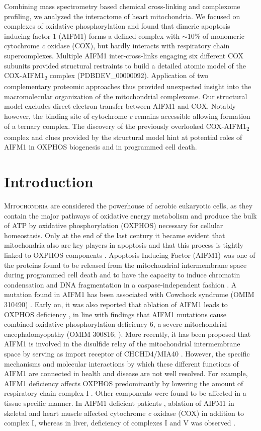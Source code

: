 \begin{abstract102}
	Combining mass spectrometry based chemical cross-linking and complexome profiling, we analyzed the interactome of heart mitochondria. We focused on complexes of oxidative phosphorylation and found that dimeric apoptosis inducing factor 1 (AIFM1) forms a defined complex with $\sim$10\% of monomeric cytochrome \emph{c} oxidase (COX), but hardly interacts with respiratory chain supercomplexes. Multiple AIFM1 inter-cross-links engaging six different COX subunits provided structural restraints to build a detailed atomic model of the COX-AIFM1\textsubscript{2} complex (PDBDEV\_00000092). Application of two complementary proteomic approaches thus provided unexpected insight into the macromolecular organization of the mitochondrial complexome. Our structural model excludes direct electron transfer between AIFM1 and COX. Notably however, the binding site of cytochrome \emph{c} remains accessible allowing formation of a ternary complex. The discovery of the previously overlooked COX-AIFM1\textsubscript{2} complex and clues provided by the structural model hint at potential roles of AIFM1 in OXPHOS biogenesis and in programmed cell death.
\end{abstract102}
\section{Introduction}
\lettrine[lraise=0.1, nindent=0em, slope=-.5em]{M}{itochondria} are considered the powerhouse of aerobic eukaryotic cells, as they contain the major pathways of oxidative energy metabolism and produce the bulk of ATP by oxidative phosphorylation (OXPHOS) necessary for cellular homeostasis. Only at the end of the last century it became evident that mitochondria also are key players in apoptosis and that this process is tightly linked to OXPHOS components \cite{RN1}. Apoptosis Inducing Factor (AIFM1) was one of the proteins found to be released from the mitochondrial intermembrane space during programmed cell death and to have the capacity to induce chromatin condensation and DNA fragmentation in a caspase-independent fashion \cite{RN2}. A mutation found in AIFM1 has been associated with Cowchock syndrome (OMIM 310490) \cite{RN3}. Early on, it was also reported that ablation of AIFM1 leads to OXPHOS deficiency \cite{RN4}, in line with findings that AIFM1 mutations cause combined oxidative phosphorylation deficiency 6, a severe mitochondrial encephalomyopathy (OMIM 300816; \cite{RN5}). More recently, it has been proposed that AIFM1 is involved in the disulfide relay of the mitochondrial intermembrane space by serving as import receptor of CHCHD4/MIA40 \cite{RN8, RN7, RN6}. However, the specific mechanisms and molecular interactions by which these different functions of AIFM1 are connected in health and disease are not well resolved. For example, AIFM1 deficiency affects OXPHOS predominantly by lowering the amount of respiratory chain complex I \cite{RN4}. Other components were found to be affected in a tissue specific manner. In AIFM1 deficient patients \cite{RN5}, ablation of AIFM1 in skeletal and heart muscle affected cytochrome \emph{c} oxidase (COX) in addition to complex I, whereas in liver, deficiency of complexes I and V was observed \cite{RN10, RN9}.

